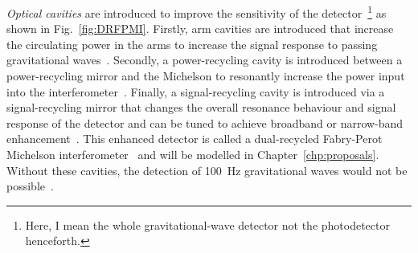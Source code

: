 \emph{Optical cavities} are introduced to improve the sensitivity of the detector~\footnote{Here, I mean the whole gravitational-wave detector not the photodetector henceforth.} as shown in Fig.~\ref{fig:DRFPMI}. %
Firstly, arm cavities are introduced that increase the circulating power in the arms to increase the signal response to passing gravitational waves~\cite{bond_2010}.
Secondly, a power-recycling cavity is introduced between a power-recycling mirror and the Michelson to resonantly increase the power input into the interferometer~\cite{meersRecyclingLaserinterferometricGravitationalwave1988,bond_2010}.
Finally, a signal-recycling cavity is introduced via a signal-recycling mirror that changes the overall resonance behaviour and signal response of the detector and can be tuned to achieve broadband or narrow-band enhancement~\cite{meersRecyclingLaserinterferometricGravitationalwave1988,1995AuJPh..48..953M}.
This enhanced detector is called a dual-recycled Fabry-Perot Michelson interferometer~\cite{meersRecyclingLaserinterferometricGravitationalwave1988,bond_2010} and will be modelled in Chapter~\ref{chp:proposals}. Without these cavities, the detection of 100~Hz gravitational waves would not be possible~\cite{AdvancedLIGO:2015}. %


